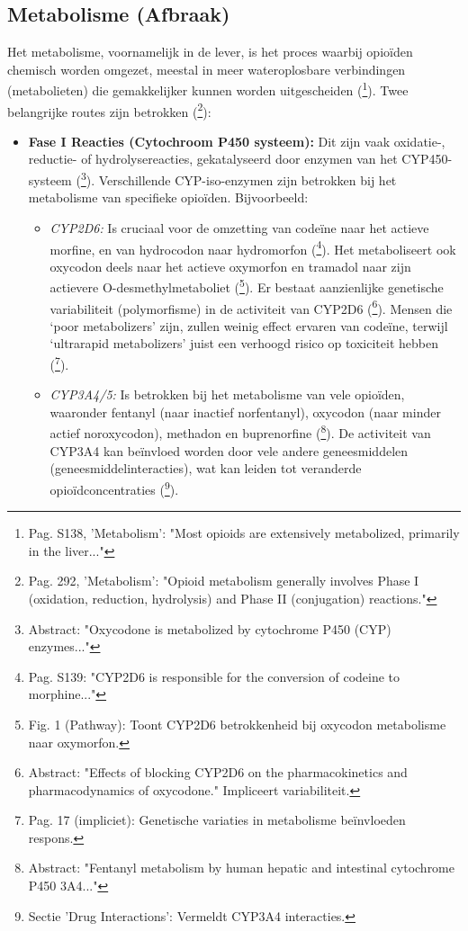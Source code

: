 \documentclass[11pt, a4paper]{report} %
\begin{document}
\subsection{Metabolisme (Afbraak)}
Het metabolisme, voornamelijk in de lever, is het proces waarbij opioïden chemisch worden omgezet, meestal in meer wateroplosbare verbindingen (metabolieten) die gemakkelijker kunnen worden uitgescheiden (\cite{Trescot2008OpioidPharm}\footnote{Pag. S138, 'Metabolism': "Most opioids are extensively metabolized, primarily in the liver..."}). Twee belangrijke routes zijn betrokken (\cite{Gupta2010ChemistryOpioids}\footnote{Pag. 292, 'Metabolism': "Opioid metabolism generally involves Phase I (oxidation, reduction, hydrolysis) and Phase II (conjugation) reactions."}):
\begin{itemize}
    \item \textbf{Fase I Reacties (Cytochroom P450 systeem):} Dit zijn vaak oxidatie-, reductie- of hydrolysereacties, gekatalyseerd door enzymen van het CYP450-systeem (\cite{Samer2019OxycodonePathway}\footnote{Abstract: "Oxycodone is metabolized by cytochrome P450 (CYP) enzymes..."}). Verschillende CYP-iso-enzymen zijn betrokken bij het metabolisme van specifieke opioïden. Bijvoorbeeld:
        \begin{itemize}
            \item \textit{CYP2D6:} Is cruciaal voor de omzetting van codeïne naar het actieve morfine, en van hydrocodon naar hydromorfon (\cite{Trescot2008OpioidPharm}\footnote{Pag. S139: "CYP2D6 is responsible for the conversion of codeine to morphine..."}). Het metaboliseert ook oxycodon deels naar het actieve oxymorfon en tramadol naar zijn actievere O-desmethylmetaboliet (\cite{PMC2019OxycodonePathway}\footnote{Fig. 1 (Pathway): Toont CYP2D6 betrokkenheid bij oxycodon metabolisme naar oxymorfon.}). Er bestaat aanzienlijke genetische variabiliteit (polymorfisme) in de activiteit van CYP2D6 (\cite{HeiskanenOlkkolaKalso1998CYP2D6Oxycodone}\footnote{Abstract: "Effects of blocking CYP2D6 on the pharmacokinetics and pharmacodynamics of oxycodone." Impliceert variabiliteit.}). Mensen die `poor metabolizers' zijn, zullen weinig effect ervaren van codeïne, terwijl `ultrarapid metabolizers' juist een verhoogd risico op toxiciteit hebben (\cite{Kosten2002NeurobiologyDependence}\footnote{Pag. 17 (impliciet): Genetische variaties in metabolisme beïnvloeden respons.}).
            \item \textit{CYP3A4/5:} Is betrokken bij het metabolisme van vele opioïden, waaronder fentanyl (naar inactief norfentanyl), oxycodon (naar minder actief noroxycodon), methadon en buprenorfine (\cite{Labroo1997FentanylMetabolism}\footnote{Abstract: "Fentanyl metabolism by human hepatic and intestinal cytochrome P450 3A4..."}). De activiteit van CYP3A4 kan beïnvloed worden door vele andere geneesmiddelen (geneesmiddelinteracties), wat kan leiden tot veranderde opioïdconcentraties (\cite{Samer2019OxycodonePathway}\footnote{Sectie 'Drug Interactions': Vermeldt CYP3A4 interacties.}).

\end{itemize}
\end{itemize}
\end{document}
